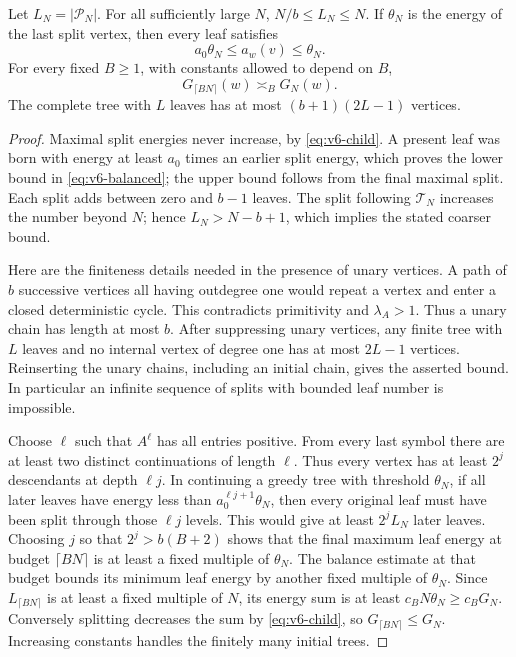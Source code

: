 \begin{lemma}\label{lem:v6-balanced}
Let $L_N=|\mathcal P_N|$. For all sufficiently large $N$,
$N/b\le L_N\le N$. If $\theta_N$ is the energy of the last split
vertex, then every leaf satisfies
\begin{equation}
        a_0\theta_N\le a_w(v)\le\theta_N.                \label{eq:v6-balanced}
\end{equation}
For every fixed $B\ge1$, with constants allowed to depend on $B$,
\begin{equation}
                   G_{\lceil BN\rceil}(w)\asymp_B G_N(w).
                                                        \label{eq:v6-dilation}
\end{equation}
The complete tree with $L$ leaves has at most $(b+1)(2L-1)$ vertices.
\end{lemma}
\begin{proof}
Maximal split energies never increase, by \eqref{eq:v6-child}.
A present leaf was born with energy at least $a_0$ times an earlier
split energy, which proves the lower bound in
\eqref{eq:v6-balanced}; the upper bound follows from the final
maximal split. Each split adds between zero and $b-1$ leaves.
The split following $\mathcal T_N$ increases the number beyond $N$;
hence $L_N>N-b+1$, which implies the stated coarser bound.

Here are the finiteness details needed in the presence of unary
vertices. A path of $b$ successive vertices all having outdegree one
would repeat a vertex and enter a closed deterministic cycle. This
contradicts primitivity and $\lambda_A>1$. Thus a unary chain has
length at most $b$. After suppressing unary vertices, any finite tree
with $L$ leaves and no internal vertex of degree one has at most
$2L-1$ vertices. Reinserting the unary chains, including an initial
chain, gives the asserted bound. In particular an infinite sequence
of splits with bounded leaf number is impossible.

Choose $\ell$ such that $A^\ell$ has all entries positive. From every
last symbol there are at least two distinct continuations of length
$\ell$. Thus every vertex has at least $2^j$ descendants at depth
$\ell j$. In continuing a greedy tree with threshold $\theta_N$, if
all later leaves have energy less than $a_0^{\ell j+1}\theta_N$,
then every original leaf must have been split through those $\ell j$
levels. This would give at least $2^jL_N$ later leaves. Choosing $j$
so that $2^j> b(B+2)$ shows that the final maximum leaf energy at
budget $\lceil BN\rceil$ is at least a fixed multiple of $\theta_N$.
The balance estimate at that budget bounds its minimum leaf energy
by another fixed multiple of $\theta_N$. Since $L_{\lceil BN\rceil}$
is at least a fixed multiple of $N$, its energy sum is at least
$c_BN\theta_N\ge c_BG_N$. Conversely splitting decreases the sum
by \eqref{eq:v6-child}, so $G_{\lceil BN\rceil}\le G_N$.
Increasing constants handles the finitely many initial trees.
\end{proof}


